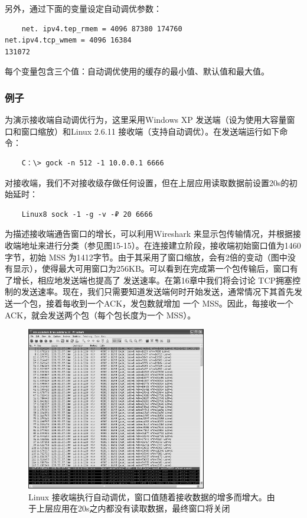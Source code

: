 另外，通过下面的变量设定自动调优参数：
\begin{verbatim}
    net. ipv4.tep_rmem = 4096 87380 174760
net.ipv4.tcp_wmem = 4096 16384
131072
\end{verbatim}

每个变量包含三个值：自动调优使用的缓存的最小值、默认值和最大值。
\subsubsection{例子}
为演示接收端自动调优行为，这里采用Windows XP 发送端（设为使用大容量窗口和窗口缩放）和Linux 2.6.11 接收端（支持自动调优）。在发送端运行如下命令：
\begin{verbatim}
    C：\> gock -n 512 -1 10.0.0.1 6666
\end{verbatim}

对接收端，我们不对接收级存做任何设置，但在上层应用读取数据前设置20s的初始延时：
\begin{verbatim}
    Linux8 sock -1 -g -v -₽ 20 6666
\end{verbatim}

为描述接收端通告窗口的增长，可以利用Wireshark 来显示包传输情况，并根据接收端地址来进行分类（参见图15-15）。在连接建立阶段，接收端初始窗口值为1460字节，初始
MSS 为1412字节。由于其采用了窗口缩放，会有2倍的变动（图中没有显示），使得最大可用窗口为256KB。可以看到在完成第一个包传输后，窗口有了增长，相应地发送端也提高了
发送速率。在第16章中我们将会讨论 TCP拥塞控制的发送速率。现在，我们只需要知道发送端何时开始发送，通常情况下其首先发送一个包，接着每收到一个ACK，发包数就增加
一个 MSS。因此，每接收一个 ACK，就会发送两个包（每个包长度为一个 MSS）。
\begin{figure}[!htb]
    \centering
	\includegraphics[width=0.7\textwidth]{imgs/15/15-15.png}
	\caption{Linux 接收端执行自动调优，窗口值随着接收数据的增多而增大。由于上层应用在20s之内都没有读取数据，最终窗口将关闭}
\end{figure}

